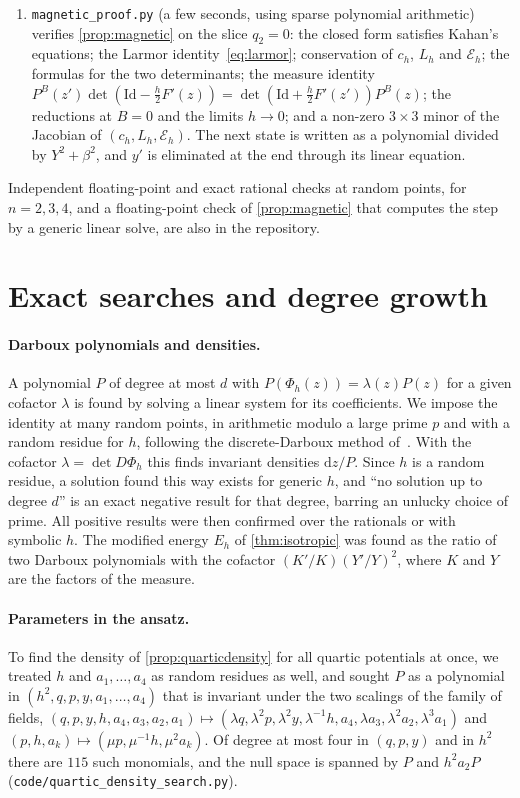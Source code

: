 \documentclass[11pt,a4paper]{article}
\theoremstyle{definition}
\theoremstyle{remark}
\newcommand{\Id}{\mathrm{Id}}
\newcommand{\dd}{\mathrm{d}}
\begin{document}
\begin{enumerate}[leftmargin=*]
  $(y_k,b_k)$ are samples of the elliptic solution at equal steps $\tau$.
\item \texttt{magnetic\_proof.py} (a few seconds, using sparse polynomial arithmetic) verifies
  \cref{prop:magnetic} on the slice $q_2=0$: the closed form satisfies Kahan's equations; the Larmor
  identity~\eqref{eq:larmor}; conservation of $c_h$, $L_h$ and $\mathcal E_h$; the formulas for the two
  determinants; the measure identity $P^B(z')\det(\Id-\frac h2F'(z))=\det(\Id+\frac h2F'(z'))P^B(z)$; the
  reductions at $B=0$ and the limits $h\to0$; and a non-zero $3\times3$ minor of the Jacobian of
  $(c_h,L_h,\mathcal E_h)$. The next state is written as a polynomial divided by $Y^2+\beta^2$, and $y'$ is
  eliminated at the end through its linear equation.
\end{enumerate}
Independent floating-point and exact rational checks at random points, for $n=2,3,4$, and a floating-point
check of \cref{prop:magnetic} that computes the step by a generic linear solve, are also in the repository.

\section{Exact searches and degree growth}\label{app:exact}

\paragraph{Darboux polynomials and densities.} A polynomial $P$ of degree at most $d$ with
$P(\Phi_h(z))=\lambda(z)P(z)$ for a given cofactor $\lambda$ is found by solving a linear system for its
coefficients. We impose the identity at many random points, in arithmetic modulo a large prime $p$ and with a
random residue for $h$, following the discrete-Darboux method of~\cite{CEMOQTvdK19}. With the cofactor
$\lambda=\det D\Phi_h$ this finds invariant densities $\dd z/P$. Since $h$ is a random residue, a solution
found this way exists for generic $h$, and ``no solution up to degree $d$'' is an exact negative result
for that degree, barring an unlucky choice of prime. All positive results were then confirmed over the rationals
or with symbolic $h$. The modified energy $E_h$ of \cref{thm:isotropic} was found as the ratio of two Darboux
polynomials with the cofactor $(K'/K)(Y'/Y)^2$, where $K$ and $Y$ are the factors of the measure.

\paragraph{Parameters in the ansatz.} To find the density of \cref{prop:quarticdensity} for all quartic
potentials at once, we treated $h$ and $a_1,\dots,a_4$ as random residues as well, and sought $P$ as a polynomial in
$(h^2,q,p,y,a_1,\dots,a_4)$ that is invariant under the two scalings of the family of fields, $(q,p,y,h,a_4,a_3,a_2,a_1)
\mapsto(\lambda q,\lambda^2p,\lambda^2y,\lambda^{-1}h,a_4,\lambda a_3,\lambda^2a_2,\lambda^3a_1)$ and
$(p,h,a_k)\mapsto(\mu p,\mu^{-1}h,\mu^2a_k)$. Of degree at most four in $(q,p,y)$ and in $h^2$ there are $115$
such monomials, and the null space is spanned by $P$ and $h^2a_2P$ (\texttt{code/quartic\_density\_search.py}).
\end{document}
